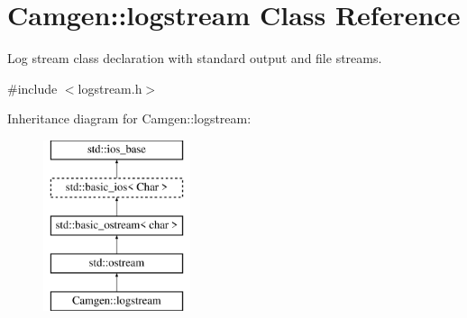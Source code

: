 \hypertarget{a00326}{\section{Camgen\-:\-:logstream Class Reference}
\label{a00326}
}


Log stream class declaration with standard output and file streams.  




{\ttfamily \#include $<$logstream.\-h$>$}

Inheritance diagram for Camgen\-:\-:logstream\-:\begin{figure}[H]
\begin{center}
\leavevmode
\includegraphics[height=5.000000cm]{a00326}
\end{center}
\end{figure}

